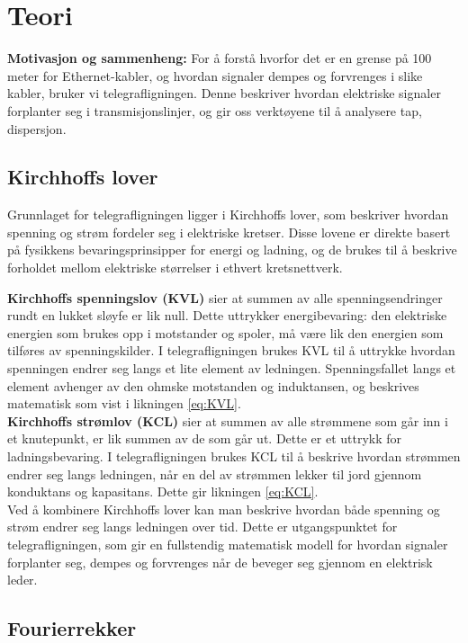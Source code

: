 
\section{Teori}

    \textbf{Motivasjon og sammenheng:} For å forstå hvorfor det er en grense på 100 meter for Ethernet-kabler, og hvordan signaler dempes og forvrenges i slike kabler, bruker vi telegrafligningen. Denne beskriver hvordan elektriske signaler forplanter seg i transmisjonslinjer, og gir oss verktøyene til å analysere tap, dispersjon.

\subsection{Kirchhoffs lover}

Grunnlaget for telegrafligningen ligger i Kirchhoffs lover, som beskriver hvordan spenning og strøm 
fordeler seg i elektriske kretser. Disse lovene er direkte basert på fysikkens bevaringsprinsipper 
for energi og ladning, og de brukes til å beskrive forholdet mellom elektriske størrelser i ethvert 
kretsnettverk.

\textbf{Kirchhoffs spenningslov (KVL)} sier at summen av alle spenningsendringer rundt en lukket 
sløyfe er lik null. Dette uttrykker energibevaring: den elektriske energien som brukes opp i motstander 
og spoler, må være lik den energien som tilføres av spenningskilder. I telegrafligningen brukes KVL 
til å uttrykke hvordan spenningen endrer seg langs et lite element av ledningen. Spenningsfallet 
langs et element avhenger av den ohmske motstanden og induktansen, og beskrives matematisk som vist i likningen \eqref{eq:KVL}.\\
\textbf{Kirchhoffs strømlov (KCL)} sier at summen av alle strømmene som går inn i et knutepunkt, 
er lik summen av de som går ut. Dette er et uttrykk for ladningsbevaring. I telegrafligningen brukes 
KCL til å beskrive hvordan strømmen endrer seg langs ledningen, når en del av strømmen lekker til jord 
gjennom konduktans og kapasitans. Dette gir likningen \eqref{eq:KCL}.\\

Ved å kombinere Kirchhoffs lover kan man beskrive hvordan både spenning og strøm endrer seg 
langs ledningen over tid. Dette er utgangspunktet for telegrafligningen, som gir 
en fullstendig matematisk modell for hvordan signaler forplanter seg, dempes og forvrenges når de beveger 
seg gjennom en elektrisk leder.

\subsection{Fourierrekker}

